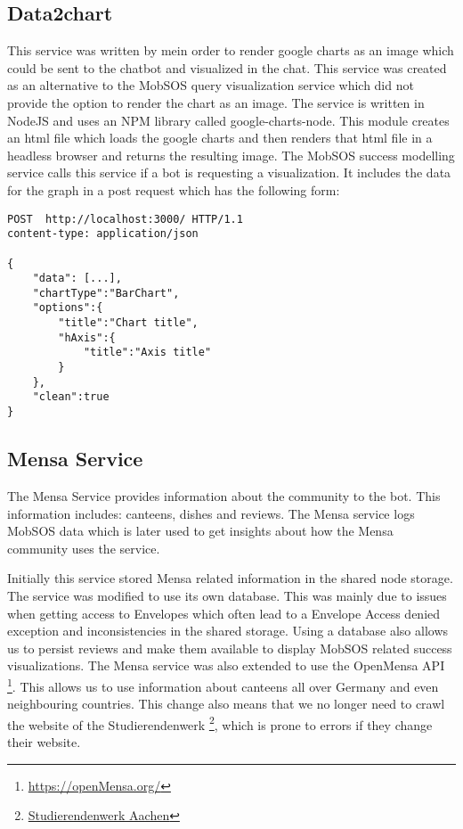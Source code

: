 \subsection{Data2chart}
This service was written by me\footnotemark in order to render google charts as an image which could be sent to the chatbot and visualized in the chat. This service was created as an alternative to the MobSOS query visualization service which did not provide the option to render the chart as an image. 
The service is written in NodeJS and uses an NPM library called google-charts-node\footnotemark.
This module creates an html file which loads the google charts and then renders that html file in a headless browser \footnotemark and returns the resulting image.
The MobSOS success modelling service calls this service if a bot is requesting a visualization. It includes the data for the graph in a post request which has the following form:

\begin{lstlisting}
POST  http://localhost:3000/ HTTP/1.1
content-type: application/json

{
    "data": [...],
    "chartType":"BarChart",
    "options":{
        "title":"Chart title",
        "hAxis":{
            "title":"Axis title"
        }
    },
    "clean":true 
}
\end{lstlisting}

\subsection{Mensa Service}
The Mensa Service provides information about the community to the bot. This information includes: canteens, dishes and reviews. The Mensa service logs MobSOS data which is later used to get insights about how the Mensa community uses the service.

Initially this service stored Mensa related information in the shared node storage. The service was modified to use its own database. This was mainly due to issues when getting access to Envelopes which often lead to a Envelope Access denied exception and inconsistencies in the shared storage. Using a database also allows us to persist reviews and make them available to display MobSOS related success visualizations.
The Mensa service was also extended to use the OpenMensa API \footnote{\url{https://openMensa.org/}}. This allows us to use information about canteens all over Germany and even neighbouring countries.
This change also means that we no longer need to crawl the website of the Studierendenwerk \footnote{\href{https://www.studierendenwerk-aachen.de/}{Studierendenwerk Aachen}}, which is prone to errors if they change their website. 

